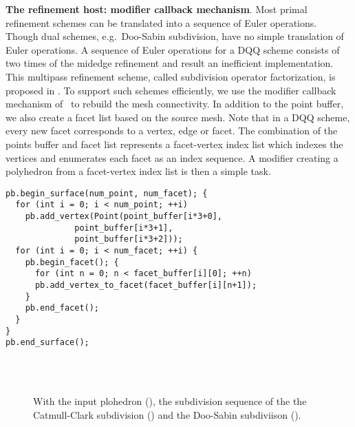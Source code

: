 \noindent\textbf{The refinement host: modifier callback mechanism}.
Most primal refinement schemes can be translated into a sequence of
Euler operations. Though dual schemes, e.g.\ Doo-Sabin subdivision,
have no simple translation of Euler operations. A sequence
of Euler operations for a DQQ scheme consists of two times 
of the midedge refinement \cite{Peters:1997:SSS} and 
result an inefficient implementation. This multipass 
refinement scheme, called subdivision operator factorization, 
is proposed in \cite{Peter:2003:CPDSS}.
To support such schemes efficiently, we use the modifier 
callback mechanism of \cgalpoly\ to rebuild the mesh
connectivity. In addition to the point buffer, we
also create a facet list based on the source mesh. Note that in a DQQ
scheme, every new facet corresponds to a vertex, edge or facet. The
combination of the points buffer and facet list represents a
facet-vertex index list which indexes the vertices and enumerates each
facet as an index sequence. A modifier creating a polyhedron from a
facet-vertex index list is then a simple task.
\begin{lstlisting}
pb.begin_surface(num_point, num_facet); {
  for (int i = 0; i < num_point; ++i) 
    pb.add_vertex(Point(point_buffer[i*3+0], 
	          point_buffer[i*3+1], 
	          point_buffer[i*3+2]));	
  for (int i = 0; i < num_facet; ++i) {
    pb.begin_facet(); {
      for (int n = 0; n < facet_buffer[i][0]; ++n)
      pb.add_vertex_to_facet(facet_buffer[i][n+1]);
    }
    pb.end_facet();
  }
}
pb.end_surface();
\end{lstlisting}


\begin{figure}
  \centering
  \\
  \vspace{0.3cm}
  \\
  \vspace{0.3cm}
  \caption{ With the input plohedron (\IT), 
  the subdivision sequence of the 
  the Catmull-Clark subdivision (\IL) and
  the Doo-Sabin subdiviison (\IR).}
  \label{fig:SubExample}
\end{figure}

